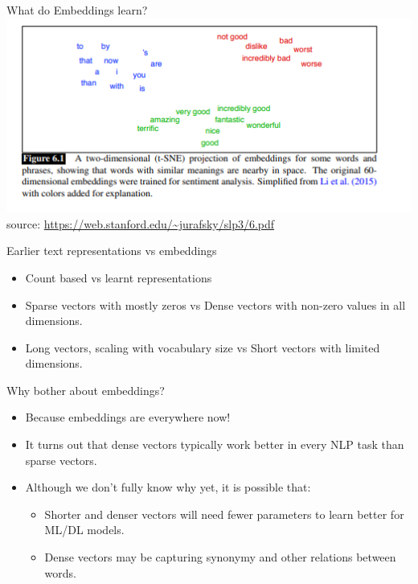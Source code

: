 \documentclass{beamer}
\begin{document}
\begin{frame}{What do Embeddings learn?}
    \includegraphics[width=\textwidth]{figures/embeddingsvisualization.PNG}
\\ \tiny source: \url{https://web.stanford.edu/~jurafsky/slp3/6.pdf}
\end{frame}

\begin{frame}{Earlier text representations vs embeddings} %
    \begin{itemize}
        \item Count based vs learnt representations
        \item Sparse vectors with mostly zeros vs Dense vectors with non-zero values in all dimensions. 
        \item Long vectors, scaling with vocabulary size vs Short vectors with limited dimensions. 
    \end{itemize}
\end{frame}

\begin{frame}{Why bother about embeddings?}
    \begin{itemize}
        \item Because embeddings are everywhere now!
        \item It turns out that dense vectors typically work better in every NLP task than sparse vectors. \pause
        \item Although we don't fully know why yet, it is possible that:
        \begin{itemize}
            \item Shorter and denser vectors will need fewer parameters to learn better for ML/DL models.
            \item Dense vectors may be capturing synonymy and other relations between words. 
        \end{itemize}
    \end{itemize}
\end{frame}
\end{document}
